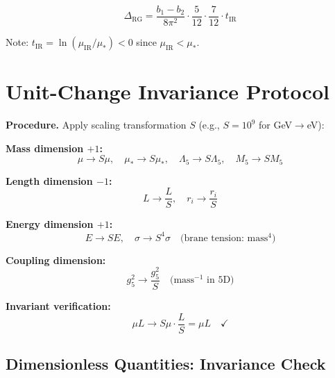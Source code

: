 \documentclass[11pt,a4paper]{article}
\theoremstyle{definition}
\begin{document}
\begin{equation}
\label{eq:delta_rg_explicit}
\Delta_{\text{RG}} = \frac{b_1 - b_2}{8\pi^2} \cdot \frac{5}{12} \cdot \frac{7}{12} \cdot t_{\text{IR}}
\end{equation}

Note: $t_{\text{IR}} = \ln(\mu_{\text{IR}}/\mu_*) < 0$ since $\mu_{\text{IR}} < \mu_*$.

\section{Unit-Change Invariance Protocol}
\label{sec:unit_invariance}

\begin{unitbox}
\textbf{Procedure.} Apply scaling transformation $S$ (e.g., $S = 10^9$ for GeV$\to$eV):

\textbf{Mass dimension $+1$:}
\begin{equation}
\label{eq:scale_m}
\mu \to S\mu, \quad \mu_* \to S\mu_*, \quad \Lambda_5 \to S\Lambda_5, \quad M_5 \to S M_5
\end{equation}

\textbf{Length dimension $-1$:}
\begin{equation}
\label{eq:scale_L}
L \to \frac{L}{S}, \quad r_i \to \frac{r_i}{S}
\end{equation}

\textbf{Energy dimension $+1$:}
\begin{equation}
\label{eq:scale_E}
E \to S E, \quad \sigma \to S^4 \sigma \quad \text{(brane tension: mass$^4$)}
\end{equation}

\textbf{Coupling dimension:}
\begin{equation}
\label{eq:scale_g5}
g_5^2 \to \frac{g_5^2}{S} \quad \text{(mass$^{-1}$ in 5D)}
\end{equation}

\textbf{Invariant verification:}
\begin{equation}
\label{eq:scale_check}
\mu L \to S\mu \cdot \frac{L}{S} = \mu L \quad \checkmark
\end{equation}
\end{unitbox}

\subsection{Dimensionless Quantities: Invariance Check}
\label{subsec:dimless_check}
\end{document}
